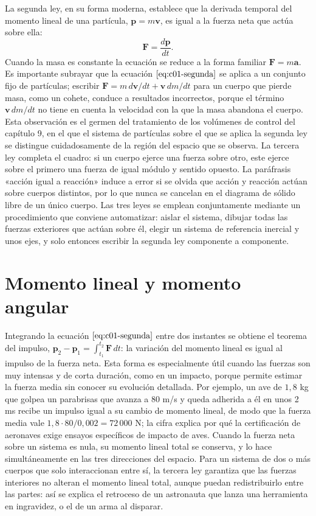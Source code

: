 \documentclass[10pt,openany]{book}
\begin{document}
La segunda ley, en su forma moderna, establece que la derivada temporal del momento lineal de una partícula, \(\mathbf{p} = m\mathbf{v}\), es igual a la fuerza neta que actúa sobre ella:
\begin{equation}
\mathbf{F} = \frac{d\mathbf{p}}{dt}. \label{eq:c01-segunda}
\end{equation}
Cuando la masa es constante la ecuación se reduce a la forma familiar \(\mathbf{F} = m\mathbf{a}\). Es importante subrayar que la ecuación \(\eqref{eq:c01-segunda}\) se aplica a un conjunto fijo de partículas; escribir \(\mathbf{F} = m\,d\mathbf{v}/dt + \mathbf{v}\,dm/dt\) para un cuerpo que pierde masa, como un cohete, conduce a resultados incorrectos, porque el término \(\mathbf{v}\,dm/dt\) no tiene en cuenta la velocidad con la que la masa abandona el cuerpo. Esta observación es el germen del tratamiento de los volúmenes de control del capítulo 9, en el que el sistema de partículas sobre el que se aplica la segunda ley se distingue cuidadosamente de la región del espacio que se observa. La tercera ley completa el cuadro: si un cuerpo ejerce una fuerza sobre otro, este ejerce sobre el primero una fuerza de igual módulo y sentido opuesto. La paráfrasis «acción igual a reacción» induce a error si se olvida que acción y reacción actúan sobre cuerpos distintos, por lo que nunca se cancelan en el diagrama de sólido libre de un único cuerpo. Las tres leyes se emplean conjuntamente mediante un procedimiento que conviene automatizar: aislar el sistema, dibujar todas las fuerzas exteriores que actúan sobre él, elegir un sistema de referencia inercial y unos ejes, y solo entonces escribir la segunda ley componente a componente.

\section{Momento lineal y momento angular}

Integrando la ecuación \(\eqref{eq:c01-segunda}\) entre dos instantes se obtiene el teorema del impulso, \(\mathbf{p}_2 - \mathbf{p}_1 = \int_{t_1}^{t_2}\mathbf{F}\,dt\): la variación del momento lineal es igual al impulso de la fuerza neta. Esta forma es especialmente útil cuando las fuerzas son muy intensas y de corta duración, como en un impacto, porque permite estimar la fuerza media sin conocer su evolución detallada. Por ejemplo, un ave de \(1{,}8\) kg que golpea un parabrisas que avanza a 80 m/s y queda adherida a él en unos 2 ms recibe un impulso igual a su cambio de momento lineal, de modo que la fuerza media vale \(1{,}8\cdot 80/0{,}002 = 72\,000\) N; la cifra explica por qué la certificación de aeronaves exige ensayos específicos de impacto de aves. Cuando la fuerza neta sobre un sistema es nula, su momento lineal total se conserva, y lo hace simultáneamente en las tres direcciones del espacio. Para un sistema de dos o más cuerpos que solo interaccionan entre sí, la tercera ley garantiza que las fuerzas interiores no alteran el momento lineal total, aunque puedan redistribuirlo entre las partes: así se explica el retroceso de un astronauta que lanza una herramienta en ingravidez, o el de un arma al disparar.
\end{document}
